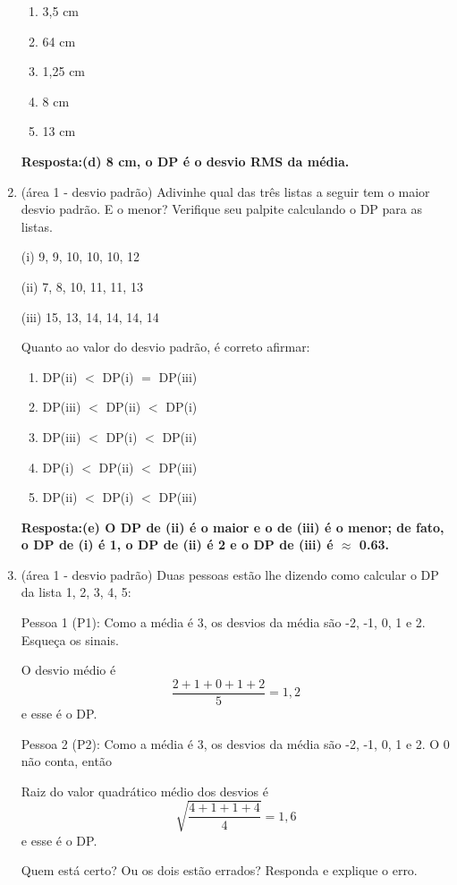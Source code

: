 \documentclass[12pt]{article}\documentclass[brazilian,12pt,a4paper,final]{article}
\begin{document}
\begin{enumerate}
\begin{enumerate}
    \item 3,5 cm
    \item 64 cm
    \item 1,25 cm
    \item 8 cm
    \item 13 cm
\end{enumerate}

\textbf{Resposta:(d) 8 cm, o DP é o desvio RMS da média.}
\item (área 1 - desvio padrão) Adivinhe qual das três listas a seguir tem o maior desvio padrão. E o menor? Verifique seu palpite
calculando o DP para as listas.

(i) 9, 9, 10, 10, 10, 12

(ii) 7, 8, 10, 11, 11, 13

(iii) 15, 13, 14, 14, 14, 14

Quanto ao valor do desvio padrão, é correto afirmar:

\begin{enumerate}
    \item DP(ii) $<$ DP(i) $=$ DP(iii)
    \item DP(iii) $<$ DP(ii) $<$ DP(i)
    \item DP(iii) $<$ DP(i) $<$ DP(ii)
    \item DP(i) $<$ DP(ii) $<$ DP(iii)
    \item DP(ii) $<$ DP(i) $<$ DP(iii)
\end{enumerate}

\textbf{Resposta:(e) O DP de (ii) é o maior e o de (iii) é o menor; de fato, o DP de (i) é 1, o DP de (ii) é 2 e o DP de (iii) é $\approx$ 0.63.}

\item (área 1 - desvio padrão) Duas pessoas estão lhe dizendo como calcular o DP da lista 1, 2, 3, 4, 5:

Pessoa 1 (P1): Como a média é 3, os desvios da média são -2, -1, 0, 1 e 2.
Esqueça os sinais.

O desvio médio é $$\frac{2 + 1 + 0 + 1 + 2}{5}=1,2 $$
e esse é o DP.

Pessoa 2 (P2): Como a média é 3, os desvios da média são -2, -1, 0, 1 e 2.
O 0 não conta, então 

Raiz do valor quadrático médio dos desvios é $$\sqrt{\frac{4 + 1 + 1 + 4}{4}}=1,6 $$
e esse é o DP.

Quem está certo? Ou os dois estão errados? Responda e explique o erro.


\end{enumerate}
\end{document}
